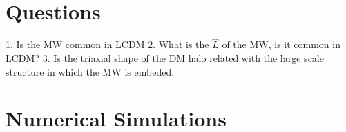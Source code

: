 \documentclass[12pt]{article}
\begin{document}
\section{Questions}

1. Is the MW common in LCDM
2. What is the $\hat{L}$ of the MW, is it common in LCDM?
3. Is the triaxial shape of the DM halo related with the large
scale structure in which the MW is embeded.


\section{Numerical Simulations}



\end{document}
